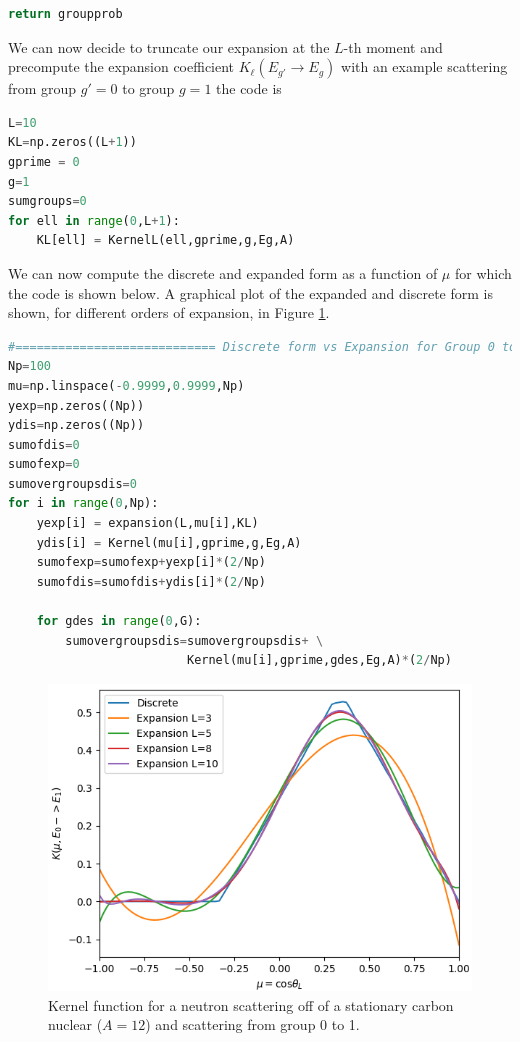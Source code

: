 \documentclass[11pt,letterpaper,titlepage]{article}
\numberwithin{equation}{section}
\begin{document}
\begin{appendices}
\begin{lstlisting}[language=python]
    return groupprob
\end{lstlisting}

We can now decide to truncate our expansion at the $L$-th moment and precompute the expansion coefficient $K_\ell(E_{g'} {\to} E_g)$ with an example scattering from group $g'=0$ to group $g=1$ the code is

\begin{lstlisting}[language=python]
L=10
KL=np.zeros((L+1))
gprime = 0
g=1
sumgroups=0
for ell in range(0,L+1):
    KL[ell] = KernelL(ell,gprime,g,Eg,A)
\end{lstlisting}

We can now compute the discrete and expanded form as a function of $\mu$ for which the code is shown below. A graphical plot of the expanded and discrete form is shown, for different orders of expansion, in Figure  \ref{fig:kernelg0tog1}.
\newpage
\begin{lstlisting}[language=python]
#============================ Discrete form vs Expansion for Group 0 to 1        
Np=100
mu=np.linspace(-0.9999,0.9999,Np)
yexp=np.zeros((Np))
ydis=np.zeros((Np))
sumofdis=0
sumofexp=0
sumovergroupsdis=0
for i in range(0,Np):
    yexp[i] = expansion(L,mu[i],KL)
    ydis[i] = Kernel(mu[i],gprime,g,Eg,A)
    sumofexp=sumofexp+yexp[i]*(2/Np)
    sumofdis=sumofdis+ydis[i]*(2/Np)
    
    for gdes in range(0,G):
        sumovergroupsdis=sumovergroupsdis+ \
                         Kernel(mu[i],gprime,gdes,Eg,A)*(2/Np)
\end{lstlisting}

\begin{figure}[H]
\centering
\includegraphics[width=0.7\linewidth]{KernelG0toG1}
\caption{Kernel function for a neutron scattering off of a stationary carbon nuclear ($A=12$) and scattering from group 0 to 1.}
\label{fig:kernelg0tog1}
\end{figure}





\end{appendices}
\end{document}

